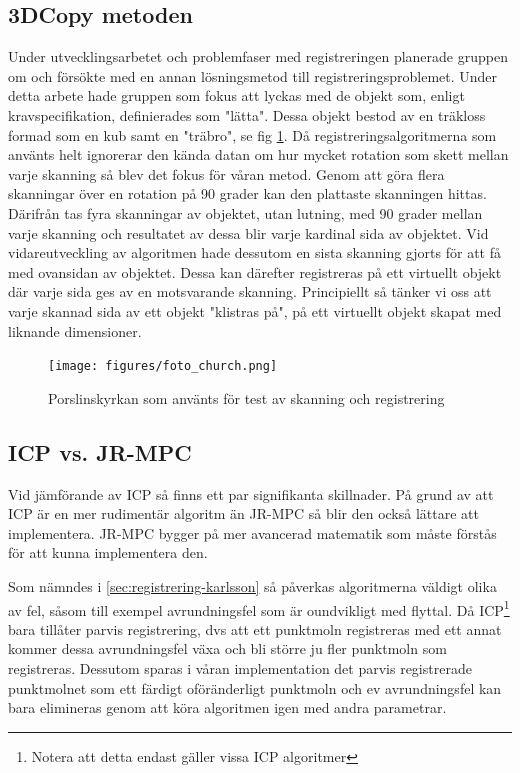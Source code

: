 \subsection{3DCopy metoden}
Under utvecklingsarbetet och problemfaser med registreringen planerade gruppen om och försökte med en annan lösningsmetod till registreringsproblemet. Under detta arbete hade gruppen som fokus att lyckas med de objekt som, enligt kravspecifikation, definierades som "lätta". Dessa objekt bestod av en träkloss formad som en kub samt en "träbro", se fig \ref{fig:foto_church}. Då registreringsalgoritmerna som använts helt ignorerar den kända datan om hur mycket rotation som skett mellan varje skanning så blev det fokus för våran metod. Genom att göra flera skanningar över en rotation på 90 grader kan den plattaste skanningen hittas. Därifrån tas fyra skanningar av objektet, utan lutning, med 90 grader mellan varje skanning och resultatet av dessa blir varje kardinal sida av objektet. Vid vidareutveckling av algoritmen hade dessutom en sista skanning gjorts för att få med ovansidan av objektet. Dessa kan därefter registreras på ett virtuellt objekt där varje sida ges av en motsvarande skanning. Principiellt så tänker vi oss att varje skannad sida av ett objekt "klistras på", på ett virtuellt objekt skapat med liknande dimensioner. 

\begin{figure}[H]
	\centering
	\texttt{[image: figures/foto\_church.png]}
	\caption{Porslinskyrkan som använts för test av skanning och registrering}
	\label{fig:foto_church}
\end{figure}

\subsection{ICP vs. JR-MPC}

Vid jämförande av ICP så finns ett par signifikanta skillnader. På grund av att ICP är en mer rudimentär algoritm än JR-MPC så blir den också lättare att implementera. JR-MPC bygger på mer avancerad matematik som måste förstås för att kunna implementera den. 

Som nämndes i \ref{sec:registrering-karlsson} så påverkas algoritmerna väldigt olika av fel, såsom till exempel avrundningsfel som är oundvikligt med flyttal. Då ICP\footnote{Notera att detta endast gäller vissa ICP algoritmer} bara tillåter parvis registrering, dvs att ett punktmoln registreras med ett annat kommer dessa avrundningsfel växa och bli större ju fler punktmoln som registreras. Dessutom sparas i våran implementation det parvis registrerade punktmolnet som ett färdigt oföränderligt punktmoln och ev avrundningsfel kan bara elimineras genom att köra algoritmen igen med andra parametrar.

